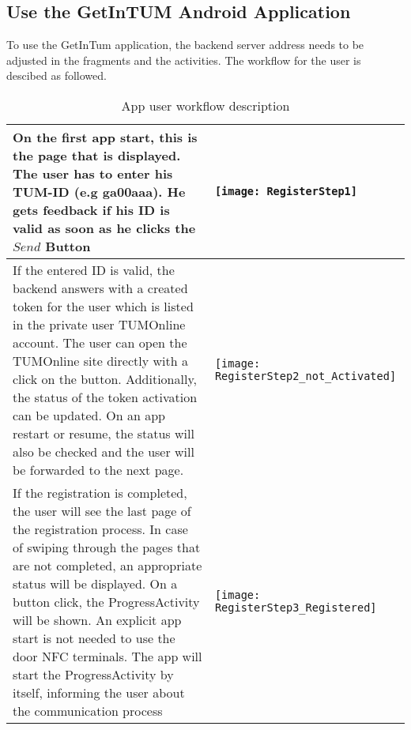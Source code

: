 

\subsection{Use the GetInTUM Android Application}

To use the GetInTum application, the backend server address needs to be adjusted in the fragments and the activities.
The workflow for the user is descibed as followed.  

\begin{table}[ht]
\caption{App user workflow description}
\centering
\begin{tabular}{*{2}{m{}}}
\hline
On the first app start, this is the page
that is displayed. The user has to enter his TUM-ID (e.g ga00aaa).
He gets feedback if his ID is valid as soon as he clicks the $Send$ Button
&\texttt{[image: RegisterStep1]}\\
\hline
If the entered ID is valid, the backend answers with a created token for
the user which is listed in the private user TUMOnline account.
The user can open the TUMOnline site directly with a click on the button.
Additionally, the status of the token activation can be updated. On an app restart or resume, the status will also be checked and the user will be forwarded to the next page.
&\texttt{[image: RegisterStep2\_not\_Activated]}\\
\hline
If the registration is completed, the user will see the last page of the registration process.
In case of swiping through the pages that are not completed, an appropriate status will be displayed. On a button click, the ProgressActivity will be shown.
An explicit app start is not needed to use the door NFC terminals. The app will start the
ProgressActivity by itself, informing the user about the communication process
&\texttt{[image: RegisterStep3\_Registered]}\\

\end{tabular}
\label{tab:gt}
\end{table}

